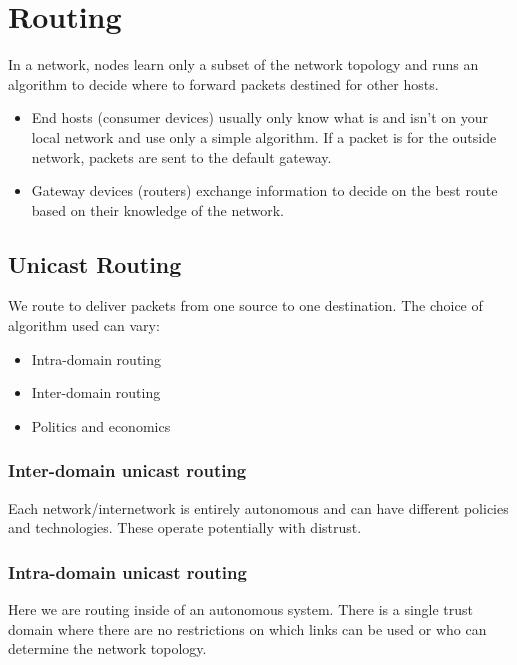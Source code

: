 \section{Routing}\label{sec:routing}

In a network, nodes learn only a subset of the network topology and runs an algorithm to decide where to forward packets destined for other hosts.

\begin{itemize}
    \item End hosts (consumer devices) usually only know what is and isn't on your local network and use only a simple algorithm.
          If a packet is for the outside network, packets are sent to the default gateway.
    \item Gateway devices (routers) exchange information to decide on the best route based on their knowledge of the network.
\end{itemize}

\subsection{Unicast Routing}\label{sub:unicast_routing}

We route to deliver packets from one source to one destination.
The choice of algorithm used can vary:
\begin{itemize}
    \item Intra-domain routing
    \item Inter-domain routing
    \item Politics and economics
\end{itemize}

\subsubsection{Inter-domain unicast routing}\label{ssub:inter_domain_unicast_routing}

Each network/internetwork is entirely autonomous and can have different policies and technologies.
These operate potentially with distrust.

\subsubsection{Intra-domain unicast routing}\label{ssub:intra_domain_unicast_routing}

Here we are routing inside of an autonomous system.
There is a single trust domain where there are no restrictions on which links can be used or who can determine the network topology.

